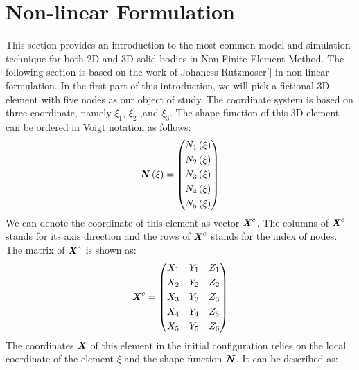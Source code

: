 \section{Non-linear Formulation}
This section provides an introduction to the most common model and simulation technique for both 2D and 3D solid bodies in Non-Finite-Element-Method. The following section is based on the work of Johaness Rutzmoser[\cite{Johannes}] in non-linear formulation. In the first part of this introduction, we will pick a fictional 3D element with five nodes as our object of study. The coordinate system is based on three coordinate, namely $\xi_1$, $\xi_2$ ,and $\xi_3$. The shape function of this 3D element can be ordered in Voigt notation as follows:
\begin{equation}
 \textbf{\textit{N}}\left(\xi\right) = \begin{pmatrix}
 N_1\left(\xi\right)           \\[0.3em]
 N_2\left(\xi\right)            \\[0.3em]
 N_3\left(\xi\right)           \\[0.3em]
 N_4\left(\xi\right)         \\[0.3em]
 N_5\left(\xi\right)                            
\end{pmatrix}
\end{equation}
We can denote the coordinate of this element as vector $\textbf{\textit{X}}^e$. The columns of $\textbf{\textit{X}}^e$ stands for its axis direction and the rows of $\textbf{\textit{X}}^e$ stands for the index of nodes. The matrix of $\textbf{\textit{X}}^e$ is shown as:
\begin{equation}
\textbf{\textit{X}}^e = \begin{pmatrix}
X_1 & Y_1 & Z_1           \\[0.3em]
X_2 & Y_2 & Z_2             \\[0.3em]
X_3 & Y_3 & Z_3           \\[0.3em]
X_4 & Y_4 & Z_5          \\[0.3em]
X_5 & Y_5 & Z_6                            
\end{pmatrix}
\end{equation}	
The coordinates $\textbf{\textit{X}}$ of this element in the initial configuration relies on the local coordinate of the element $\xi$ and the shape function $\textbf{\textit{N}}$. It can be described as:
